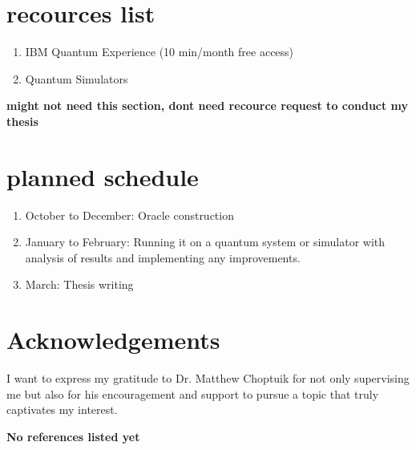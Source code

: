 \documentclass[twocolumn,showpacs,preprintnumbers,amsmath,amssymb]{revtex4}
\begin{document}
		\section{recources list}
		\begin{enumerate}
			\item IBM Quantum Experience (10 min/month free access)
			\item Quantum Simulators
		\end{enumerate}
		
		\textbf{might not need this section, dont need recource request to conduct my thesis}
		\section{planned schedule}
		
		
		\begin{enumerate}
			\item October to December:  Oracle construction
			\item January to February:  Running it on a quantum system or simulator with analysis of results and implementing any improvements.
			\item  March: Thesis writing
		\end{enumerate}
		
		
		
		\section{Acknowledgements}
		
		I want to express my gratitude to Dr. Matthew Choptuik for not only supervising me but also 
		for his encouragement and support to pursue a topic that truly captivates my interest.
		
		\begin{thebibliography}{99}
			
			\textbf{No references listed yet}
			
		\end{thebibliography}
		
		
	
\end{document}
